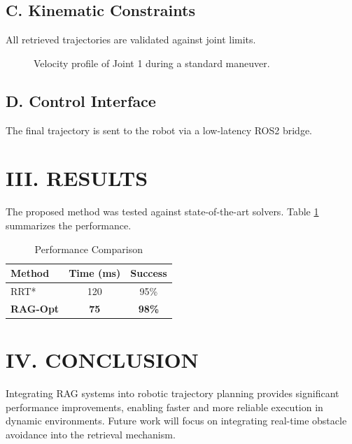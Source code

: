 \documentclass[10pt,a4paper,twocolumn]{article}
\begin{document}
\subsection{C. Kinematic Constraints}
All retrieved trajectories are validated against joint limits.
\begin{figure}[h]
    \centering
    \caption{Velocity profile of Joint 1 during a standard maneuver.}
    \label{fig:vel}
\end{figure}

\subsection{D. Control Interface}
The final trajectory is sent to the robot via a low-latency ROS2 bridge.

\section{III. RESULTS}
The proposed method was tested against state-of-the-art solvers. Table \ref{tab:res} summarizes the performance.

\begin{table}[h]
    \centering
    \caption{Performance Comparison}
    \label{tab:res}
    \begin{tabularx}{\linewidth}{|X|c|c|}
        \hline
        \textbf{Method} & \textbf{Time (ms)} & \textbf{Success} \\ \hline
        RRT* & 120 & 95\% \\ \hline
        \textbf{RAG-Opt} & \textbf{75} & \textbf{98\%} \\ \hline
    \end{tabularx}
\end{table}

\section{IV. CONCLUSION}
Integrating RAG systems into robotic trajectory planning provides significant performance improvements, enabling faster and more reliable execution in dynamic environments. Future work will focus on integrating real-time obstacle avoidance into the retrieval mechanism.
\end{document}
